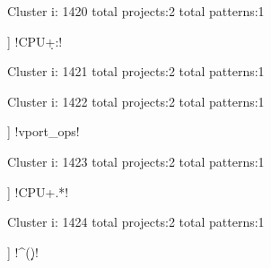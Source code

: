 Cluster i: 1420
total projects:2
total patterns:1
\begin{multicols}{1}
\begin{description}[noitemsep,topsep=0pt]
\item [[2] ] \cverb!CPU\d+:!
\end{description}
\end{multicols}







Cluster i: 1421
total projects:2
total patterns:1
\begin{multicols}{1}
\end{multicols}







Cluster i: 1422
total projects:2
total patterns:1
\begin{multicols}{1}
\begin{description}[noitemsep,topsep=0pt]
\item [[2] ] \cverb!vport_ops!
\end{description}
\end{multicols}







Cluster i: 1423
total projects:2
total patterns:1
\begin{multicols}{1}
\begin{description}[noitemsep,topsep=0pt]
\item [[2] ] \cverb!CPU\s+.*!
\end{description}
\end{multicols}







Cluster i: 1424
total projects:2
total patterns:1
\begin{multicols}{1}
\begin{description}[noitemsep,topsep=0pt]
\item [[2] ] \cverb!^(\d\d)!
\end{description}
\end{multicols}







